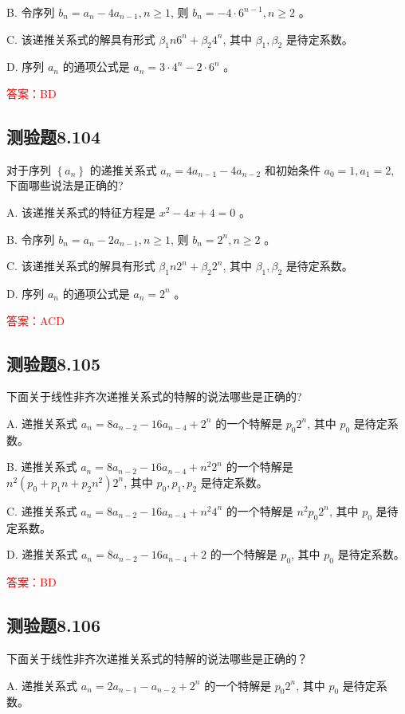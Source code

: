 \documentclass[UTF8, heading=true]{ctexart}
\begin{document}
B. 
令序列 $b_n=a_n-4 a_{n-1}, n \geq 1$, 则 $b_n=-4 \cdot 6^{n-1}, n \geq 2$ 。

C. 
该递推关系式的解具有形式 $\beta_1 n 6^n+\beta_2 4^n$, 其中 $\beta_1, \beta_2$ 是待定系数。

D. 
序列 $a_n$ 的通项公式是 $a_n=3 \cdot 4^n-2 \cdot 6^n$ 。

\textcolor{red}{答案：BD}

\subsection{测验题8.104}

对于序列 $\left\{a_n\right\}$ 的递推关系式 $a_n=4 a_{n-1}-4 a_{n-2}$ 和初始条件 $a_0=1, a_1=2$, 下面哪些说法是正确的?

A. 该递推关系式的特征方程是 $x^2-4 x+4=0$ 。

B. 令序列 $b_n=a_n-2 a_{n-1}, n \geq 1$, 则 $b_n=2^n, n \geq 2$ 。

C. 该递推关系式的解具有形式 $\beta_1 n 2^n+\beta_2 2^n$, 其中 $\beta_1, \beta_2$ 是待定系数。

D. 序列 $a_n$ 的通项公式是 $a_n=2^n$ 。

\textcolor{red}{答案：ACD}

\subsection{测验题8.105}

下面关于线性非齐次递推关系式的特解的说法哪些是正确的?

A. 递推关系式 $a_n=8 a_{n-2}-16 a_{n-4}+2^n$ 的一个特解是 $p_0 2^n$, 其中 $p_0$ 是待定系数。

B. 递推关系式 $a_n=8 a_{n-2}-16 a_{n-4}+n^2 2^n$ 的一个特解是 $n^2\left(p_0+p_1 n+p_2 n^2\right) 2^n$, 其中 $p_0, p_1, p_2$ 是待定系数。

C. 递推关系式 $a_n=8 a_{n-2}-16 a_{n-4}+n^2 4^n$ 的一个特解是 $n^2 p_0 2^n$, 其中 $p_0$ 是待定系数。

D. 递推关系式 $a_n=8 a_{n-2}-16 a_{n-4}+2$ 的一个特解是 $p_0$, 其中 $p_0$ 是待定系数。

\textcolor{red}{答案：BD}

\subsection{测验题8.106}

下面关于线性非齐次递推关系式的特解的说法哪些是正确的？

A. 递推关系式 $a_n=2 a_{n-1}-a_{n-2}+2^n$ 的一个特解是 $p_0 2^n$, 其中 $p_0$ 是待定系数。
\end{document}

